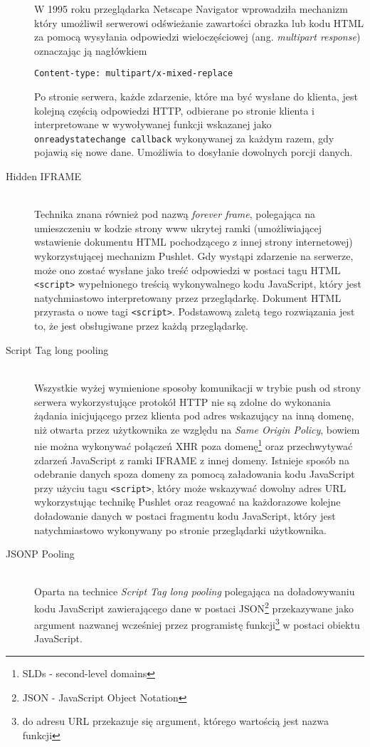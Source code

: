 \begin{description}
  W 1995 roku przeglądarka Netscape Navigator wprowadziła mechanizm który umożliwił serwerowi odświeżanie zawartości obrazka lub kodu HTML za pomocą wysyłania odpowiedzi wieloczęściowej (ang. \emph{multipart response}) oznaczając ją nagłówkiem

\lstinline{Content-type: multipart/x-mixed-replace}\cite{xhr-rfc}

  Po stronie serwera, każde zdarzenie, które ma być wysłane do klienta, jest kolejną częścią odpowiedzi HTTP, odbierane po stronie klienta i interpretowane w wywoływanej funkcji wskazanej jako \lstinline{onreadystatechange callback} wykonywanej za każdym razem, gdy pojawią się nowe dane. Umożliwia to dosyłanie dowolnych porcji danych.

  \item[Hidden IFRAME] \hfill \\
  Technika znana również pod nazwą \emph{forever frame}, polegająca na umieszczeniu w kodzie strony www ukrytej ramki (umożliwiającej wstawienie dokumentu HTML pochodzącego z innej strony internetowej) wykorzystującej mechanizm Pushlet. Gdy wystąpi zdarzenie na serwerze, może ono zostać wysłane jako treść odpowiedzi w postaci tagu HTML
  \lstinline{<script>}
  wypełnionego treścią wykonywalnego kodu JavaScript, który jest natychmiastowo interpretowany przez przeglądarkę. Dokument HTML przyrasta o nowe tagi \lstinline{<script>}. Podstawową zaletą tego rozwiązania jest to, że jest obsługiwane przez każdą przeglądarkę.

  \item[Script Tag long pooling] \hfill \\
  Wszystkie wyżej wymienione sposoby komunikacji w trybie push od strony serwera wykorzystujące protokół HTTP nie są zdolne do wykonania żądania inicjującego przez klienta pod adres wskazujący na inną domenę, niż otwarta przez użytkownika ze względu na \emph{Same Origin Policy}, bowiem nie można wykonywać połączeń XHR poza domenę\footnote{SLDs - second-level domains} oraz przechwytywać zdarzeń JavaScript z ramki IFRAME z innej domeny. Istnieje sposób na odebranie danych spoza domeny za pomocą załadowania kodu JavaScript przy użyciu tagu \lstinline{<script>}, który może wskazywać dowolny adres URL wykorzystując technikę Pushlet oraz reagować na każdorazowe kolejne doładowanie danych w postaci fragmentu kodu JavaScript, który jest natychmiastowo wykonywany po stronie przeglądarki użytkownika.
  
  \item[JSONP Pooling] \hfill \\
  Oparta na technice \emph{Script Tag long pooling} polegająca na doładowywaniu kodu JavaScript zawierającego dane w postaci JSON\footnote{JSON - JavaScript Object Notation} przekazywane jako argument nazwanej wcześniej przez programistę funkcji\footnote{do adresu URL przekazuje się argument, którego wartością jest nazwa funkcji} w postaci obiektu JavaScript.
  

\end{description}

